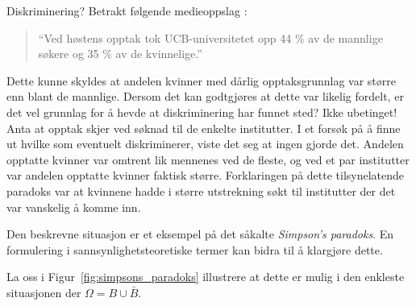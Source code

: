 \begin{eksempel}{Diskriminering?}
Betrakt følgende medieoppslag :
\begin{quote}
``Ved høstens opptak tok UCB-universitetet opp 44 \% av de mannlige 
søkere og 35 \% av de kvinnelige.''
\end{quote}
Dette kunne skyldes at andelen kvinner med dårlig opptaksgrunnlag 
var større enn blant de mannlige. Dersom det kan godtgjøres at
dette var likelig fordelt, er det vel grunnlag for å hevde at
diskriminering har funnet sted? Ikke ubetinget!
Anta at opptak skjer ved søknad til de enkelte institutter.
I et forsøk  på å finne ut hvilke som eventuelt diskriminerer,
viste det seg at ingen gjorde det. Andelen opptatte kvinner var omtrent
lik mennenes ved de fleste, og ved et par institutter var andelen opptatte 
kvinner faktisk større. Forklaringen på dette tilsynelatende
paradoks var at kvinnene hadde i større utstrekning søkt til
institutter der det var vanskelig å komme inn.
\end{eksempel}
Den beskrevne situasjon er et eksempel på det såkalte 
{\em Simpson's paradoks}. En formulering i sannsynlighetsteoretiske termer
kan bidra til å klargjøre dette.
\begin{center}  \end{center}
La oss i Figur~\ref{fig:simpsons_paradoks} illustrere at dette er mulig i den enkleste situasjonen der
$\Omega = B\cup \bar{B}$.

